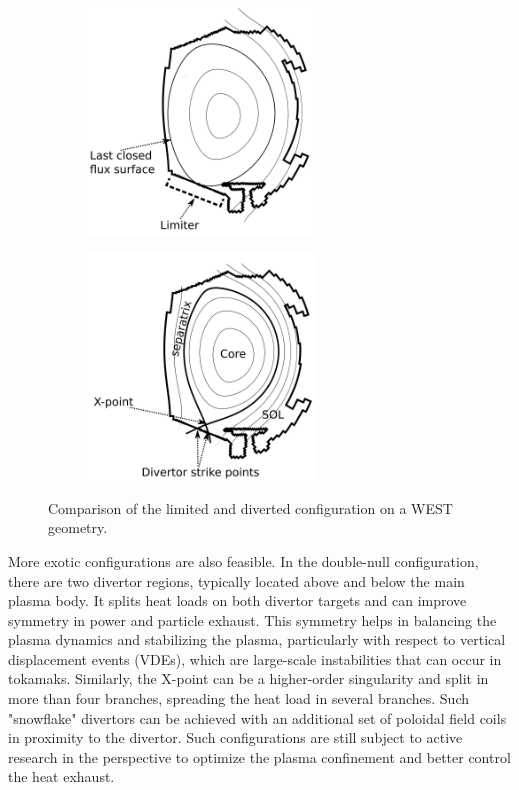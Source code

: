 \begin{figure}[H]
	\centering
	\begin{subfigure}[b]{0.45\textwidth}
		\centering
		\includegraphics[height=60mm]{schemes/WESTlimited.png}
		\label{fig:WEST_limited}
	\end{subfigure}
	\begin{subfigure}[b]{0.45\textwidth}
		\centering
		\includegraphics[height=60mm]{schemes/WESTdiverted.png}
		\label{fig:WEST_diverted}
	\end{subfigure}
	\caption{Comparison of the limited and diverted configuration on a WEST geometry. }
	\label{fig:1_limdivConfigs}
\end{figure}



More exotic configurations are also feasible. In the double-null configuration, there are two divertor regions, typically located above and below the main plasma body. It splits heat loads on both divertor targets and can improve symmetry in power and particle exhaust. This symmetry helps in balancing the plasma dynamics and stabilizing the plasma, particularly with respect to vertical displacement events (VDEs), which are large-scale instabilities that can occur in tokamaks. Similarly, the X-point can be a higher-order singularity and split in more than four branches, spreading the heat load in several branches\cite{ryutov2008magnetic}. Such "snowflake" divertors can be achieved with an additional set of poloidal field coils in proximity to the divertor. Such configurations are still subject to active research in the perspective to optimize the plasma confinement and better control the heat exhaust. \\

